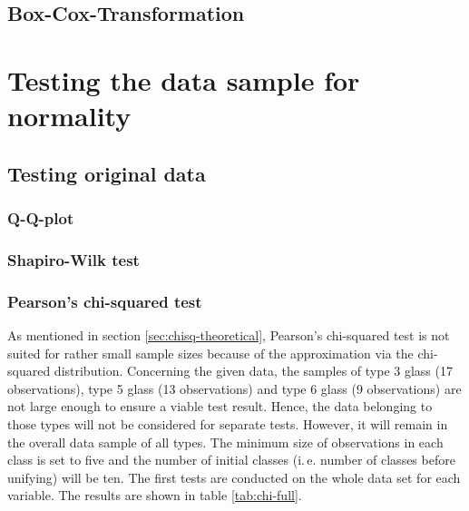 \documentclass[a4paper, 12pt, titlepage, headsepline, listof = totoc, bibliography = totoc, numbers = noenddot]{scrartcl}
\newcommand{\ie}{i.\,e. }
\begin{document}
\subsection{Box-Cox-Transformation}



\newpage
\section{Testing the data sample for normality}

\subsection{Testing original data}

\subsubsection{Q-Q-plot}

\subsubsection{Shapiro-Wilk test}

\subsubsection{Pearson's chi-squared test}
As mentioned in section \ref{sec:chisq-theoretical}, Pearson's chi-squared test is not suited for rather small sample sizes because of the approximation via the chi-squared distribution. Concerning the given data, the samples of type 3 glass (17 observations), type 5 glass (13 observations) and type 6 glass (9 observations) are not large enough to ensure a viable test result. Hence, the data belonging to those types will not be considered for separate tests. However, it will remain in the overall data sample of all types. The minimum size of observations in each class is set to five and the number of initial classes (\ie number of classes before unifying) will be ten. The first tests are conducted on the whole data set for each variable. The results are shown in table \ref{tab:chi-full}.
\end{document}
